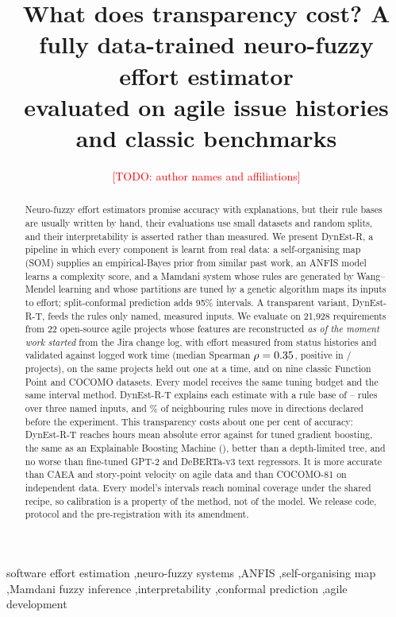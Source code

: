 \documentclass[preprint,12pt,authoryear]{elsarticle}
\newcommand{\dynest}{DynEst-R\xspace}
\newcommand{\todo}[1]{\textcolor{red}{[TODO: #1]}}
\begin{document}
\begin{frontmatter}

\title{What does transparency cost? A fully data-trained neuro-fuzzy effort estimator\\
evaluated on agile issue histories and classic benchmarks}

\author{\todo{author names and affiliations}}

\begin{abstract}
Neuro-fuzzy effort estimators promise accuracy with explanations, but their rule bases are usually written by hand,
their evaluations use small datasets and random splits, and their interpretability is asserted rather than measured.
We present \dynest, a pipeline in which every component is learnt from real data: a self-organising map (SOM) supplies
an empirical-Bayes prior from similar past work, an ANFIS model learns a complexity score, and a Mamdani system whose
rules are generated by Wang--Mendel learning and whose partitions are tuned by a genetic algorithm maps its inputs to
effort; split-conformal prediction adds 95\% intervals.  A transparent variant, \dynest-T, feeds the rules only
named, measured inputs.  We evaluate on 21,928 requirements from 22 open-source agile projects whose features are
reconstructed \emph{as of the moment work started} from the Jira change log, with effort measured from status
histories and validated against logged work time (median Spearman $\rho=0.35$, positive in
\ProxyPositive/\ProxyProjects{} projects), on the same projects held out one at a time, and on nine classic Function
Point and COCOMO datasets.  Every model receives the same tuning budget and the same interval method.  \dynest-T
explains each estimate with a rule base of \TRulesMin--\TRulesMax{} rules over three named inputs, and
\TMonoMean\% of neighbouring rules move in directions declared before the experiment.  This transparency costs about
one per cent of accuracy: \dynest-T reaches \ElevenMAEt{} hours mean absolute error against \ElevenMAEGBM{} for tuned
gradient boosting, the same as an Explainable Boosting Machine (\ElevenMAEEBM), better than a depth-limited tree, and
no worse than fine-tuned GPT-2 and DeBERTa-v3 text regressors.  It is more accurate than CAEA and story-point
velocity on agile data and than COCOMO-81 on independent data.  Every model's intervals reach nominal coverage under
the shared recipe, so calibration is a property of the method, not of the model.  We release code, protocol and the
pre-registration with its amendment.
\end{abstract}

\begin{keyword}
software effort estimation \sep neuro-fuzzy systems \sep ANFIS \sep self-organising map \sep Mamdani fuzzy inference
\sep interpretability \sep conformal prediction \sep agile development
\end{keyword}

\end{frontmatter}
\end{document}
